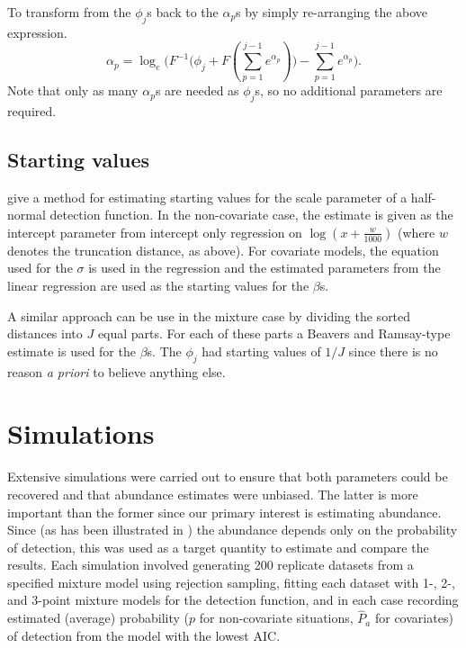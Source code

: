To transform from the $\phi_j$s back to the $\alpha_p$s by simply re-arranging the above expression.
\begin{equation*}
\alpha_p = \log_e \Big(F^{-1}\Big(\phi_j + F(\sum_{p=1}^{j-1} e^{\alpha_p})\Big) - \sum_{p=1}^{j-1} e^{\alpha_p}\Big).
\end{equation*}
Note that only as many $\alpha_p$s are needed as $\phi_j$s, so no additional parameters are required.

\subsection{Starting values}

 give a method for estimating starting values for the scale parameter of a half-normal detection function. In the non-covariate case, the estimate is given as the intercept parameter from intercept only regression on $\log(x+\frac{w}{1000})$ (where $w$ denotes the truncation distance, as above). For covariate models, the equation used for the $\sigma$ is used in the regression and the estimated parameters from the linear regression are used as the starting values for the $\beta$s.

A similar approach can be use in the mixture case by dividing the sorted distances into $J$ equal parts. For each of these parts a Beavers and Ramsay-type estimate is used for the $\beta$s. The $\phi_j$ had starting values of $1/J$ since there is no reason \textit{a priori} to believe anything else.

\section{Simulations}
\label{mmds-sims}

Extensive simulations were carried out to ensure that both parameters could be recovered and that abundance estimates were unbiased. The latter is more important than the former since our primary interest is estimating abundance. Since (as has been illustrated in ) the abundance depends only on the probability of detection, this was used as a target quantity to estimate and compare the results. Each simulation involved generating 200 replicate datasets from a specified mixture model using rejection sampling, fitting each dataset with 1-, 2-, and 3-point mixture models for the detection function, and in each case recording estimated (average) probability ($p$ for non-covariate situations, $\hat{P}_a$ for covariates) of detection from the model with the lowest AIC.

